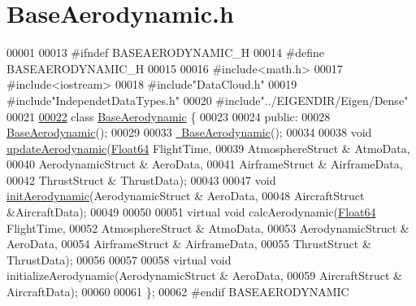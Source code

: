 \hypertarget{_base_aerodynamic_8h_source}{}\section{Base\+Aerodynamic.\+h}
\label{_base_aerodynamic_8h_source}

\begin{DoxyCode}
00001 
00013 \textcolor{preprocessor}{#ifndef BASEAERODYNAMIC\_H}
00014 \textcolor{preprocessor}{#define BASEAERODYNAMIC\_H}
00015 
00016 \textcolor{preprocessor}{#include<math.h>}
00017 \textcolor{preprocessor}{#include<iostream>}
00018 \textcolor{preprocessor}{#include"DataCloud.h"}
00019 \textcolor{preprocessor}{#include"IndependetDataTypes.h"}
00020 \textcolor{preprocessor}{#include"../EIGENDIR/Eigen/Dense"}
00021 
\hyperlink{group___aerodynamic}{00022} \textcolor{keyword}{class }\hyperlink{group___aerodynamic_class_base_aerodynamic}{BaseAerodynamic} \{
00023 
00024 \textcolor{keyword}{public}:
00028     \hyperlink{group___aerodynamic_aa05d0598119b1364cdb45cf478ae578c}{BaseAerodynamic}();
00029 
00033     \hyperlink{group___aerodynamic_a81d08f3a779e6e25245b6f3b545920cb}{~BaseAerodynamic}();
00034 
00038     \textcolor{keywordtype}{void} \hyperlink{group___aerodynamic_a6354f3c8433c7a2235041f843d4fe10e}{updateAerodynamic}(\hyperlink{group___tools_ga3f1431cb9f76da10f59246d1d743dc2c}{Float64} FlightTime,
00039                             AtmosphereStruct & AtmoData,
00040                             AerodynamicStruct & AeroData,
00041                             AirframeStruct & AirframeData,
00042                             ThrustStruct & ThrustData);
00043 
00047     \textcolor{keywordtype}{void} \hyperlink{group___aerodynamic_a5ea58755a40507d217848efb151879c8}{initAerodynamic}(AerodynamicStruct & AeroData,
00048                          AircraftStruct &AircraftData);
00049 
00050 
00051     \textcolor{keyword}{virtual} \textcolor{keywordtype}{void} calcAerodynamic(\hyperlink{group___tools_ga3f1431cb9f76da10f59246d1d743dc2c}{Float64} FlightTime,
00052                                 AtmosphereStruct & AtmoData,
00053                                 AerodynamicStruct & AeroData,
00054                                 AirframeStruct & AirframeData,
00055                                 ThrustStruct & ThrustData);
00056 
00057 
00058     \textcolor{keyword}{virtual} \textcolor{keywordtype}{void} initializeAerodynamic(AerodynamicStruct & AeroData, 
00059                                        AircraftStruct & AircraftData);
00060 
00061 \};
00062 \textcolor{preprocessor}{#endif BASEAERODYNAMIC}
\end{DoxyCode}
